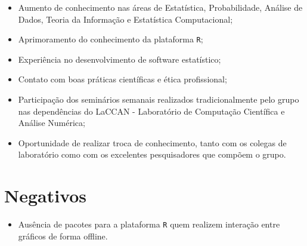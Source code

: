 \documentclass[12pt,letterpaper]{article}
\begin{document}
\begin{itemize}
\item Aumento de conhecimento nas áreas de Estatística, Probabilidade, Análise de Dados, Teoria da Informação e Estatística Computacional;
\item Aprimoramento do conhecimento da plataforma \texttt R;
\item Experiência no desenvolvimento de software estatístico;
\item Contato com boas práticas científicas e ética profissional;
\item Participação dos seminários semanais realizados tradicionalmente pelo grupo nas dependências do LaCCAN - Laboratório de Computação Científica e Análise Numérica;
\item Oportunidade de realizar troca de conhecimento, tanto com os colegas de laboratório como com os excelentes pesquisadores que compõem o grupo.
\end{itemize}

\section{Negativos}

\begin{itemize}
\item Ausência de pacotes para a plataforma \texttt R quem realizem interação entre gráficos de forma offline.
\end{itemize}


\newpage



\end{document}
